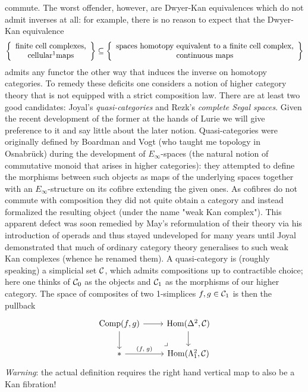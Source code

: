     commute. The worst offender, however, are Dwyer-Kan equivalences which do not admit inverses at all: for example, there is no reason to expect that the Dwyer-Kan equivalence
    \begin{equation*}
        \left\{   
            \begin{array}{c} 
                \text{finite cell complexes,} \\
                \text{cellular\footnotemark maps}
            \end{array}
        \right\} 
        \subseteq 
        \left\{
            \begin{array}{c}
                \text{spaces homotopy equivalent to a finite cell complex,} \\
                \text{continuous maps}
            \end{array}
        \right\}
    \end{equation*}
    admits any functor the other way that induces the inverse on homotopy categories.
    To remedy these deficits one considers a notion of higher category theory that is not equipped with a strict composition law. There are at least two good candidates: Joyal's \emph{quasi-categories} and Rezk's \emph{complete Segal spaces}. Given the recent development of the former at the hands of Lurie we will give preference to it and say little about the later notion.
    Quasi-categories were originally defined by Boardman and Vogt (who taught me topology in Osnabrück) during the development of $E_{\infty}$-spaces (the natural notion of commutative monoid that arises in higher categories): they attempted to define the morphisms between such objects as maps of the underlying spaces together with an $E_{\infty}$-structure on its cofibre extending the given ones.
    As cofibres do not commute with composition they did not quite obtain a category and instead formalized the resulting object (under the name "weak Kan complex").
    This apparent defect was soon remedied by May's reformulation of their theory via his introduction of operads and thus stayed undeveloped for many years until Joyal demonstrated that much of ordinary category theory generalises to such weak Kan complexes (whence he renamed them). A quasi-category is (roughly speaking) a simplicial set $\mathcal{C}$, which admits compositions up to contractible choice; here one thinks of $\mathcal{C}_0$ as the objects and $\mathcal{C}_1$ as the morphisms of our higher category. The space of composites of two 1-simplices $f, g \in \mathcal{C}_1$ is then the pullback
    \begin{equation*}
        \begin{tikzcd}
            \operatorname{Comp}(f,g) \arrow[r] \arrow[d]
            \arrow[dr, phantom, "\lrcorner", very near end]
            & \Hom(\Delta^2, \Cc) \arrow[d] \\
            * \arrow[r, "{(f,\; g)}"]
            & \Hom(\Lambda^2_1, \Cc) 
        \end{tikzcd}        
    \end{equation*}    
    \emph{Warning}: the actual definition requires the right hand vertical map to also be a Kan fibration!
    
